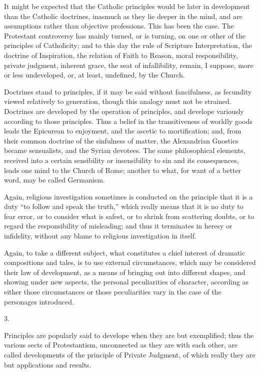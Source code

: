 It might be expected that the Catholic principles
would be later in development than the Catholic
doctrines, inasmuch as they lie deeper in the mind, and
are assumptions rather than objective professions. This
has been the case. The Protestant controversy has mainly
turned, or is turning, on one or other of the principles
of Catholicity; and to this day the rule of Scripture
Interpretation, the doctrine of Inspiration, the relation
of Faith to Reason, moral responsibility, private
judgment, inherent grace, the seat of infallibility,
remain, I suppose, more or less undeveloped, or, at
least, undefined, by the Church.

Doctrines stand to principles, if it may be said
without fancifulness, as fecundity viewed relatively to
generation, though this analogy must not be strained.
Doctrines are developed by the operation of principles,
and develope variously according to those principles.
Thus a belief in the transitiveness of worldly goods
leads the Epicurean to enjoyment, and the ascetic to
mortification; and, from their common doctrine of the
sinfulness of matter, the Alexandrian Gnostics became
sensualists, and the Syrian devotees. The same
philosophical elements, received into a certain
sensibility or insensibility to sin and its consequences,
leads one mind to the Church of Rome; another to what,
for want of a better word, may be called Germanism.

Again, religious investigation sometimes is conducted
on the principle that it is a duty ``to follow and
speak the truth,'' which really means that it is no
duty to fear error, or to consider what is safest, or to
shrink from scattering doubts, or to regard the
responsibility of misleading; and thus it terminates in
heresy or infidelity, without any blame to religious
investigation in itself.

Again, to take a different subject, what constitutes a
chief interest of dramatic compositions and tales, is to
use external circumstances, which may be considered their
law of development, as a means of bringing out into
different shapes, and showing under new aspects, the
personal peculiarities of character, according as either
those circumstances or those peculiarities vary in the
case of the personages introduced.

3.

Principles are popularly said to develope when they
are but exemplified; thus the various sects of
Protestantism, unconnected as they are with each other,
are called developments of the principle of Private
Judgment, of which really they are but applications and
results.

